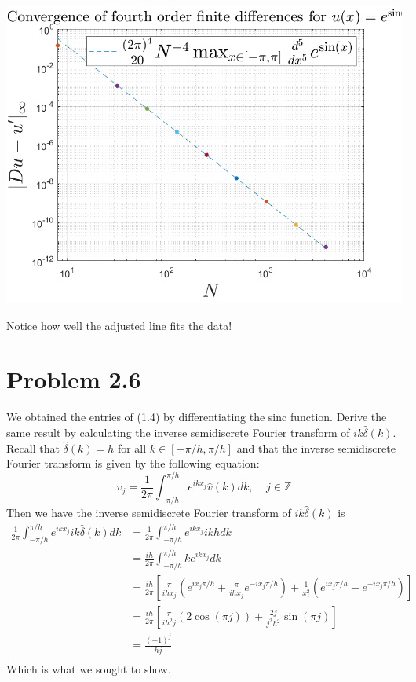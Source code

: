 \documentclass{article}
\begin{document}
\begin{center}
    \includegraphics[scale = 0.6]{correctedError.png}
\end{center}
Notice how well the adjusted line fits the data!

\section*{Problem 2.6}
We obtained the entries of (1.4) by differentiating the sinc function. Derive the same result by calculating the inverse semidiscrete Fourier transform of $ik\hat{\delta}(k)$.
\newline\newline
Recall that $\hat{\delta}(k) = h$ for all $k \in [-\pi/h, \pi/h]$ and that the inverse semidiscrete Fourier transform is given by the following equation:
\[v_j = \frac{1}{2\pi}\int_{-\pi/h}^{\pi/h}e^{ikx_j}\hat{v}(k)dk, \;\;\;\; j \in \mathbb{Z}\]
Then we have the inverse semidiscrete Fourier transform of $ik\hat{\delta}(k)$ is
\begin{align*}
    \frac{1}{2\pi}\int_{-\pi/h}^{\pi/h}e^{ikx_j}ik\hat{\delta}(k)dk &= \frac{1}{2\pi}\int_{-\pi/h}^{\pi/h}e^{ikx_j}ikhdk \\
    &= \frac{ih}{2\pi}\int_{-\pi/h}^{\pi/h}ke^{ikx_j}dk \\
    &= \frac{ih}{2\pi}\left[\frac{\pi}{ihx_j}(e^{ix_j\pi/h} + \frac{\pi}{ihx_j}e^{-ix_j\pi/h}) + \frac{1}{x_j^2}(e^{ix_j\pi/h} - e^{-ix_j\pi/h})\right] \\
    &= \frac{ih}{2\pi}\left[\frac{\pi}{ih^2j}(2\cos(\pi j)) + \frac{2j}{j^2h^2}\sin(\pi j)\right] \\
    &= \frac{(-1)^j}{hj} \\
\end{align*}
Which is what we sought to show.
\end{document}
